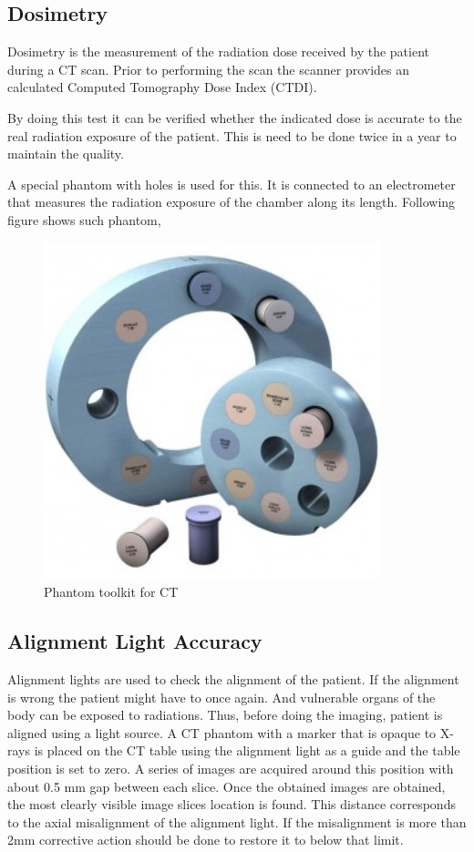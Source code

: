 \documentclass[12pt]{article}
\begin{document}
\pagebreak

\subsection{Dosimetry}
Dosimetry is the measurement of the radiation dose received by the patient during a CT scan. Prior to performing the scan the scanner  provides an calculated Computed Tomography Dose Index (CTDI).

By doing this test it can be verified whether the indicated dose is accurate to the real radiation exposure of the patient. This is need to be done twice in a year to maintain the quality. 

A special phantom with holes is used for this. It is connected to an electrometer that measures the radiation exposure of the chamber along its length. Following figure shows such phantom,
\begin{figure}[h!]
  \centering
  \includegraphics[width=0.45\linewidth]{phantom.jpg}
  \caption{\small{Phantom toolkit for CT}}
  \label{fig:Phantom toolkit for CT}
\end{figure}

\subsection{Alignment Light Accuracy}
Alignment lights are used to check the alignment of the patient. If the alignment is wrong the patient might have to once again. And vulnerable organs of the body can be exposed to radiations. Thus, before doing the imaging, patient is aligned using a light source. A CT phantom with a marker that is opaque to X-rays is placed on the CT table using the alignment light as a guide and the table position is set to zero. A series of images are acquired around this position with about 0.5 mm gap between each slice. Once the obtained images are obtained, the most clearly visible image slices location is found. This distance corresponds to the axial misalignment of the alignment light. If the misalignment is more than 2mm corrective action should be done to restore it to below that limit. 
\end{document}

